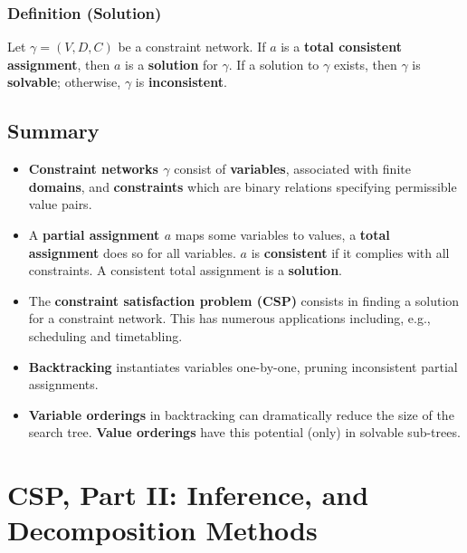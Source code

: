\documentclass[conference, a4paper]{styles/acmsiggraph}
\begin{document}
        \subsubsection{Definition (Solution)}
            Let $\gamma = (V,D,C)$ be a constraint network. 
            If $a$ is a \textbf{total consistent assignment}, then $a$ is a \textbf{solution} for $\gamma$.
            If a solution to $\gamma$ exists, then $\gamma$ is \textbf{solvable}; otherwise, $\gamma$ is \textbf{inconsistent}.
        
    \subsection{Summary}
        \begin{itemize}
            \item \textbf{Constraint networks $\gamma$} consist of \textbf{variables}, associated with finite \textbf{domains}, and \textbf{constraints} which are binary relations specifying permissible value pairs.
            \item A \textbf{partial assignment $a$} maps some variables to values, a \textbf{total assignment} does so for all variables. 
            $a$ is \textbf{consistent} if it complies with all constraints.
            A consistent total assignment is a \textbf{solution}.
            \item The \textbf{constraint satisfaction problem (CSP)} consists in finding a solution for a constraint network.
            This has numerous applications including, e.g., scheduling and timetabling.
            \item \textbf{Backtracking} instantiates variables one-by-one, pruning inconsistent partial assignments.
            \item \textbf{Variable orderings} in backtracking can dramatically reduce the size of the search tree. 
            \textbf{Value orderings} have this potential (only) in solvable sub-trees.
        \end{itemize}
    
    
    
    
    
    
    
    
    
    
\section{CSP, Part II: Inference, and Decomposition Methods}
    
\end{document}
